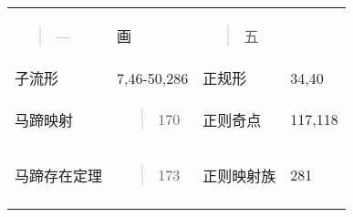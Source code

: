 \begin{longtable}[]{@{}llll@{}}
\toprule
\endhead
\begin{minipage}[t]{0.22\columnwidth}\raggedright
\begin{quote}
{---}
\end{quote}\strut
\end{minipage} & \begin{minipage}[t]{0.22\columnwidth}\raggedright
画\strut
\end{minipage} & \begin{minipage}[t]{0.22\columnwidth}\raggedright
\begin{quote}
五
\end{quote}\strut
\end{minipage} & \begin{minipage}[t]{0.22\columnwidth}\raggedright
\strut
\end{minipage}\tabularnewline
子流形 & 7,46-50,286 & 正规形 & 34,40\tabularnewline
\begin{minipage}[t]{0.22\columnwidth}\raggedright
马蹄映射\strut
\end{minipage} & \begin{minipage}[t]{0.22\columnwidth}\raggedright
\begin{quote}
170
\end{quote}\strut
\end{minipage} & \begin{minipage}[t]{0.22\columnwidth}\raggedright
正则奇点\strut
\end{minipage} & \begin{minipage}[t]{0.22\columnwidth}\raggedright
117,118\strut
\end{minipage}\tabularnewline
\begin{minipage}[t]{0.22\columnwidth}\raggedright
马蹄存在定理\strut
\end{minipage} & \begin{minipage}[t]{0.22\columnwidth}\raggedright
\begin{quote}
173
\end{quote}\strut
\end{minipage} & \begin{minipage}[t]{0.22\columnwidth}\raggedright
正则映射族\strut
\end{minipage} & \begin{minipage}[t]{0.22\columnwidth}\raggedright
281\strut
\end{minipage}\tabularnewline
\begin{minipage}[t]{0.22\columnwidth}\raggedright

\end{minipage}
\end{longtable}
